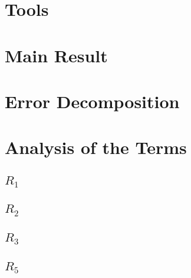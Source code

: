 \section{Tools}
  
\section{Main Result}
  
\section{Error Decomposition}
  
\section{Analysis of the Terms}
  \subsection{$R_1$}
    
  \subsection{$R_2$}
    
  \subsection{$R_3$}
    
  \subsection{$R_5$}
    
